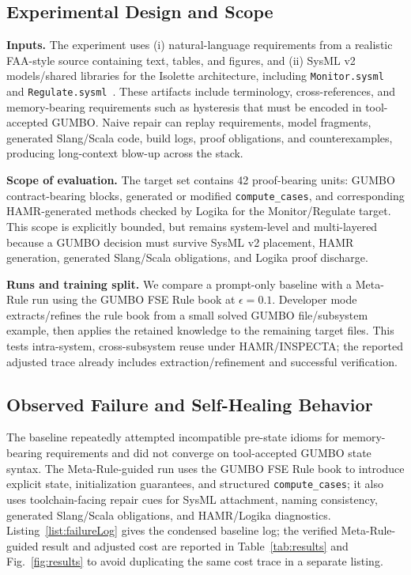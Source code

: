 \documentclass[conference]{IEEEtran}
\begin{document}
\subsection{Experimental Design and Scope}
\textbf{Inputs.} The experiment uses (i) natural-language requirements from a realistic FAA-style source containing text, tables, and figures, and (ii) SysML v2 models/shared libraries for the Isolette architecture, including \texttt{Monitor.sysml} and \texttt{Regulate.sysml}~\cite{lempia2009faa}. These artifacts include terminology, cross-references, and memory-bearing requirements such as hysteresis that must be encoded in tool-accepted GUMBO. Naive repair can replay requirements, model fragments, generated Slang/Scala code, build logs, proof obligations, and counterexamples, producing long-context blow-up across the stack.

\textbf{Scope of evaluation.} The target set contains 42 proof-bearing units: GUMBO contract-bearing blocks, generated or modified \texttt{compute\_cases}, and corresponding HAMR-generated methods checked by Logika for the Monitor/Regulate target. This scope is explicitly bounded, but remains system-level and multi-layered because a GUMBO decision must survive SysML v2 placement, HAMR generation, generated Slang/Scala obligations, and Logika proof discharge.

\textbf{Runs and training split.} We compare a prompt-only baseline with a Meta-Rule run using the GUMBO FSE Rule book at $\epsilon=0.1$. Developer mode extracts/refines the rule book from a small solved GUMBO file/subsystem example, then applies the retained knowledge to the remaining target files. This tests intra-system, cross-subsystem reuse under HAMR/INSPECTA; the reported adjusted trace already includes extraction/refinement and successful verification.

\subsection{Observed Failure and Self-Healing Behavior}
The baseline repeatedly attempted incompatible pre-state idioms for memory-bearing requirements and did not converge on tool-accepted GUMBO state syntax. The Meta-Rule-guided run uses the GUMBO FSE Rule book to introduce explicit state, initialization guarantees, and structured \texttt{compute\_cases}; it also uses toolchain-facing repair cues for SysML attachment, naming consistency, generated Slang/Scala obligations, and HAMR/Logika diagnostics. Listing~\ref{list:failureLog} gives the condensed baseline log; the verified Meta-Rule-guided result and adjusted cost are reported in Table~\ref{tab:results} and Fig.~\ref{fig:results} to avoid duplicating the same cost trace in a separate listing.
\end{document}
